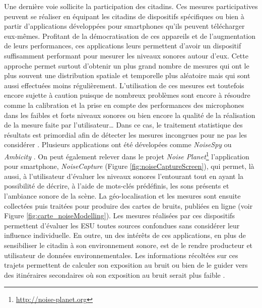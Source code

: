 Une dernière voie sollicite la participation des citadins. Ces mesures participatives peuvent se réaliser en équipant les citadins de dispositifs spécifiques \cite{delaitre2014influence} ou bien à partir d'applications développées pour smartphones qu'ils peuvent télécharger eux-mêmes. Profitant de la démocratisation de ces appareils et de l'augmentation de leurs performances, ces applications leurs permettent d'avoir un dispositif suffisamment performant pour mesurer les niveaux sonores autour d'eux. Cette approche permet surtout d'obtenir un plus grand nombre de mesures qui ont le plus souvent une distribution spatiale et temporelle plus aléatoire mais qui sont aussi effectuées moins régulièrement. L'utilisation de ces mesures est toutefois encore sujette à caution puisque de nombreux problèmes sont encore à résoudre comme la calibration et la prise en compte des performances des microphones dans les faibles et forts niveaux sonores \cite{aumond2017study} ou bien encore la qualité de la réalisation de la mesure faite par l'utilisateur\dots{} Dans ce cas, le traitement statistique des résultats est primordial afin de détecter les mesures incongrues pour ne pas les considérer \cite{guillaume2016noise}. Plusieurs applications ont été dévelopées comme \textit{NoiseSpy} \cite{kanjo_noisespy_2010} ou \textit{Ambicity} \cite{ventura2017estimation}. On peut également relever dans le projet \textit{Noise Planet}\footnote{\url{http://noise-planet.org}} l'application pour smartphone, \textit{NoiseCapture} \cite{guillaume2016noise} (Figure \ref{fig:noiseCaptureScreen}), qui permet, là aussi, à l'utilisateur d'évaluer les niveaux sonores l'entourant tout en ayant la possibilité de décrire, à l'aide de mots-clés prédéfinis, les sons présents et l'ambiance sonore de la scène. La géo-localisation et les mesures sont ensuite collectées puis traitées pour produire des cartes de bruits, publiées en ligne (voir Figure \ref{fig:carte_noiseModelling}). 
Les mesures réalisées par ces dispositifs permettent d'évaluer les ESU toutes sources confondues sans considérer leur influence individuelle. 
En outre, un des intérêts de ces applications, en plus de sensibiliser le citadin à son environnement sonore, est de le rendre producteur et utilisateur de données environnementales. Les informations récoltées sur ces trajets permettent de calculer son exposition au bruit ou bien de le guider vers des itinéraires secondaires où son exposition au bruit serait plus faible \cite{aumond2016sound}.\\


